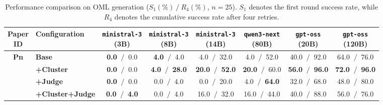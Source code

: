\begin{table}[htbp]
    \centering
    \small
    \setlength{\tabcolsep}{4pt}
    \caption{Performance comparison on OML generation ($S_1(\%)~/~R_4(\%)$, $n=25$). $S_1$ denotes the first round success rate, while $R_4$ denotes the cumulative success rate after four retries.}
    \begin{tabular}{c|l|cccccc}
        \hline
        \makecell{\textbf{Paper} \\ \textbf{ID}} & \textbf{Configuration} & \makecell{\texttt{ministral-3} \\ (3B)} & \makecell{\texttt{ministral-3} \\ (8B)} & \makecell{\texttt{ministral-3} \\ (14B)} & \makecell{\texttt{qwen3-next} \\ (80B)} & \makecell{\texttt{gpt-oss} \\ (20B)} & \makecell{\texttt{gpt-oss} \\ (120B)} \\
        \hline
        
        \multirow{4}{*}{\textbf{Pn}} 
          & \textbf{Base}& \textbf{0.0} $~/~$ 0.0 & \textbf{4.0} $~/~$ 4.0 & 4.0 $~/~$ 32.0 & 4.0 $~/~$ 52.0 & 40.0 $~/~$ 92.0 & 64.0 $~/~$ 76.0 \\
          & \textbf{+Cluster}& \textbf{0.0} $~/~$ 0.0 & \textbf{4.0} $~/~$ \textbf{28.0} & \textbf{20.0} $~/~$ \textbf{52.0} & \textbf{20.0} $~/~$ 60.0 & \textbf{56.0} $~/~$ \textbf{96.0} & \textbf{72.0} $~/~$ \textbf{96.0} \\
          & \textbf{+Judge}& \textbf{0.0} $~/~$ 0.0 & 0.0 $~/~$ 4.0 & 0.0 $~/~$ 20.0 & 4.0 $~/~$ \textbf{64.0} & 32.0 $~/~$ 68.0 & 48.0 $~/~$ 80.0 \\
          & \textbf{+Cluster+Judge}& \textbf{0.0} $~/~$ \textbf{4.0} & 0.0 $~/~$ 4.0 & 16.0 $~/~$ 32.0 & 16.0 $~/~$ 44.0 & 40.0 $~/~$ 88.0 & 56.0 $~/~$ 76.0 \\
        \hline
        
    \end{tabular}
    \label{tab:success_rates_pn}
\end{table}